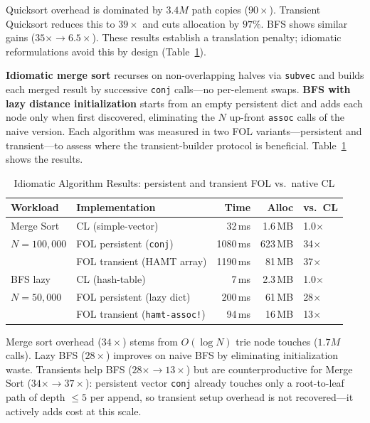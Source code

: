 \documentclass[sigconf,nonacm]{acmart}
\begin{document}
Quicksort overhead is dominated by $3.4M$ path copies ($90\times$). Transient Quicksort reduces this to $39\times$ and cuts allocation by $97\%$. BFS shows similar gains ($35\times \to 6.5\times$). These results establish a translation penalty; idiomatic reformulations avoid this by design (Table~\ref{tab:idiomatic-bench}).

\textbf{Idiomatic merge sort} recurses on non-overlapping halves via \texttt{subvec} and builds each merged result by successive \texttt{conj} calls---no per-element swaps. \textbf{BFS with lazy distance initialization} starts from an empty persistent dict and adds each node only when first discovered, eliminating the $N$ up-front \texttt{assoc} calls of the naive version. Each algorithm was measured in two FOL variants---persistent and transient---to assess where the transient-builder protocol is beneficial. Table~\ref{tab:idiomatic-bench} shows the results.

\begin{table}[htbp]
\small
\caption{Idiomatic Algorithm Results: persistent and transient FOL vs.\ native CL}
\label{tab:idiomatic-bench}
\begin{tabular}{llrrl}
\toprule
\textbf{Workload} & \textbf{Implementation} & \textbf{Time} & \textbf{Alloc} & \textbf{vs.\ CL} \\
\midrule
Merge Sort      & CL (simple-vector)              &   32\,ms &   1.6\,MB & 1.0$\times$ \\
$N=100{,}000$   & FOL persistent (\texttt{conj})  & 1080\,ms & 623\,MB   & 34$\times$ \\
                & FOL transient (HAMT array)      & 1190\,ms &  81\,MB   & 37$\times$ \\
\midrule
BFS lazy        & CL (hash-table)                 &    7\,ms &   2.3\,MB & 1.0$\times$ \\
$N=50{,}000$    & FOL persistent (lazy dict)      &  200\,ms &  61\,MB   & 28$\times$ \\
                & FOL transient (\texttt{hamt-assoc!}) &   94\,ms &  16\,MB   & 13$\times$ \\
\bottomrule
\end{tabular}
\end{table}

Merge sort overhead ($34\times$) stems from $O(\log N)$ trie node touches ($1.7M$ calls). Lazy BFS ($28\times$) improves on naive BFS by eliminating initialization waste. Transients help BFS ($28\times \to 13\times$) but are counterproductive for Merge Sort ($34\times \to 37\times$): persistent vector \texttt{conj} already touches only a root-to-leaf path of depth $\le 5$ per append, so transient setup overhead is not recovered---it actively adds cost at this scale.
\end{document}
